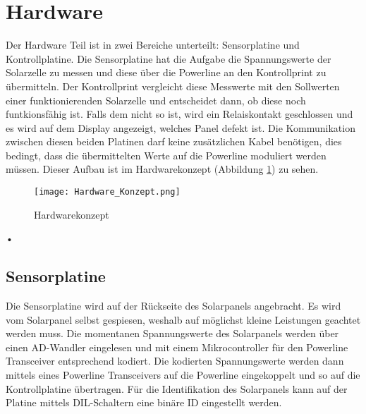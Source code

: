 %
%
%

\section{Hardware}

Der Hardware Teil ist in zwei Bereiche unterteilt: Sensorplatine und Kontrollplatine. Die Sensorplatine hat die Aufgabe die Spannungswerte der Solarzelle zu messen und diese über die Powerline an den Kontrollprint zu übermitteln.
Der Kontrollprint vergleicht diese Messwerte mit den Sollwerten einer funktionierenden Solarzelle und entscheidet dann, ob diese noch funtkionsfähig ist. Falls dem nicht so ist, wird ein Relaiskontakt geschlossen und es wird auf dem Display angezeigt, welches Panel defekt ist. 
Die Kommunikation zwischen diesen beiden Platinen darf keine zusätzlichen Kabel benötigen, dies bedingt, dass die übermittelten Werte auf die Powerline moduliert werden müssen. Dieser Aufbau ist im Hardwarekonzept (Abbildung \ref{fig::Hardwarekonzept}) zu sehen.

\begin{figure}[h]
\centering
\texttt{[image: Hardware\_Konzept.png]}%
\caption{Hardwarekonzept}
\label{fig::Hardwarekonzept}%
\end{figure}

\begin{flushright}
•
\end{flushright}\subsection{Sensorplatine}


Die Sensorplatine wird auf der Rückseite des Solarpanels angebracht. Es wird vom Solarpanel selbst gespiesen, weshalb auf möglichst kleine Leistungen geachtet werden muss. Die momentanen Spannungswerte des Solarpanels werden über einen AD-Wandler eingelesen und mit einem Mikrocontroller für den Powerline Transceiver entsprechend kodiert. Die kodierten Spannungswerte werden dann mittels eines Powerline Transceivers auf die Powerline eingekoppelt und so auf die Kontrollplatine übertragen. Für die Identifikation des Solarpanels kann auf der Platine mittels DIL-Schaltern eine binäre ID eingestellt werden.

